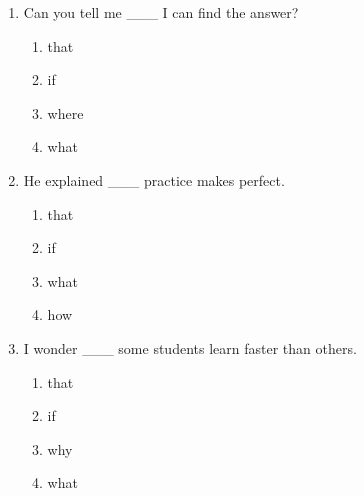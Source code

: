 \documentclass[11pt,a4paper]{ctexart}
\begin{document}
\begin{enumerate}[leftmargin=*,itemsep=4pt]
\begin{enumerate}[label=\Alph*.,leftmargin=2em,itemsep=1pt,topsep=2pt]
\item what
\item how
\end{enumerate}
\item Can you tell me \_\_\_ I can find the answer?
\begin{enumerate}[label=\Alph*.,leftmargin=2em,itemsep=1pt,topsep=2pt]
\item that
\item if
\item where
\item what
\end{enumerate}
\item He explained \_\_\_ practice makes perfect.
\begin{enumerate}[label=\Alph*.,leftmargin=2em,itemsep=1pt,topsep=2pt]
\item that
\item if
\item what
\item how
\end{enumerate}
\item I wonder \_\_\_ some students learn faster than others.
\begin{enumerate}[label=\Alph*.,leftmargin=2em,itemsep=1pt,topsep=2pt]
\item that
\item if
\item why
\item what
\end{enumerate}
\end{enumerate}
\end{document}
